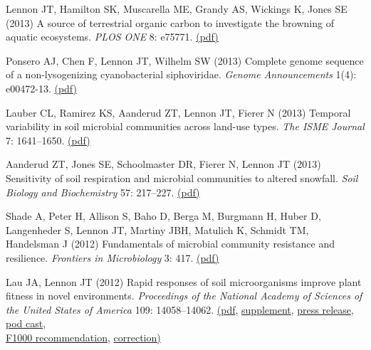 \documentclass[11pt]{article}
\begin{document}
\begin{etaremune}
\item Lennon JT, Hamilton SK, Muscarella ME, Grandy AS, Wickings K, Jones SE (2013) A source of terrestrial organic carbon to investigate the browning of aquatic ecosystems. \textit{PLOS ONE} 8: e75771. \href{https://lennonlab.github.io/assets/publications/Lennon_etal_2013.pdf}{(pdf)}

\item Ponsero AJ, Chen F, Lennon JT, Wilhelm SW (2013) Complete genome sequence of a non-lysogenizing cyanobacterial siphoviridae. \textit{Genome Announcements} 1(4): e00472-13. \href{https://lennonlab.github.io/assets/publications/Ponsero_etal_2013.pdf}{(pdf)}

\item Lauber CL, Ramirez KS, Aanderud ZT, Lennon JT, Fierer N (2013) Temporal variability in soil microbial communities across land-use types. \textit{The ISME Journal} 7: 1641–1650. \href{https://lennonlab.github.io/assets/publications/Lauber_etal_2013.pdf}{(pdf)}

\item Aanderud ZT, Jones SE, Schoolmaster DR, Fierer N, Lennon JT (2013) Sensitivity of soil respiration and microbial communities to altered snowfall. \textit{Soil Biology and Biochemistry} 57: 217–227. \href{https://lennonlab.github.io/assets/publications/Aanderud_etal_2013.pdf}{(pdf)}

\item Shade A, Peter H, Allison S, Baho D, Berga M, Burgmann H, Huber D, Langenheder S, Lennon JT, Martiny JBH, Matulich K, Schmidt TM, Handelsman J (2012) Fundamentals of microbial community resistance and resilience. \textit{Frontiers in Microbiology} 3: 417. \href{https://lennonlab.github.io/assets/publications/Shade_etal_2012.pdf}{(pdf)}

\item Lau JA, Lennon JT (2012) Rapid responses of soil microorganisms improve plant fitness in novel environments. \textit{Proceedings of the National Academy of Sciences of the United States of America} 109: 14058–14062. \href{https://lennonlab.github.io/assets/publications/Lau_Lennon_2012.pdf}{(pdf}, \href{https://lennonlab.github.io/assets/publications/Lau_Lennon_2012_Suppl.pdf}{supplement}, \href{https://www.sciencedaily.com/releases/2012/08/120814110957.htm}{press release}, \href{http://www.bacteriofiles.com/2012/09/bacteriofiles-micro-edition-103.html}{pod cast}, \\ \href{https://f1000.com/prime/717978110}{F1000 recommendation}, \href{https://www.pnas.org/doi/10.1073/pnas.2118690118}{correction)}


\end{etaremune}
\end{document}
